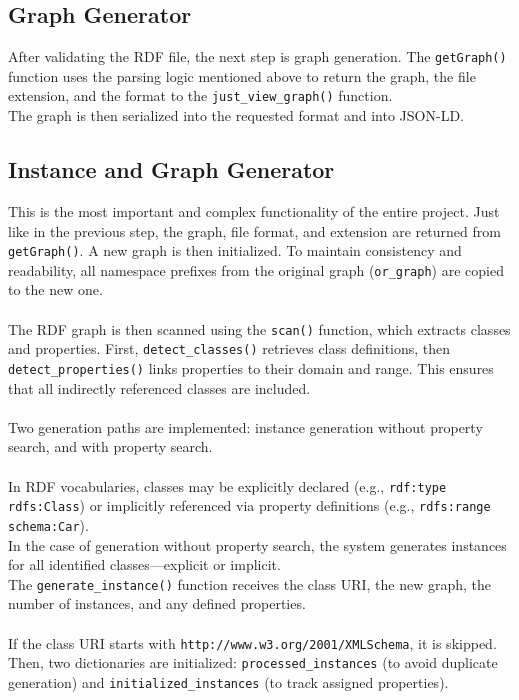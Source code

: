 \subsection{Graph Generator}
After validating the RDF file, the next step is graph generation. The \texttt{getGraph()} function uses the parsing logic mentioned above to return the graph, the file extension, and the format to the \texttt{just\_view\_graph()} function.
\\
The graph is then serialized into the requested format and into JSON-LD.

\subsection{Instance and Graph Generator}
This is the most important and complex functionality of the entire project. 
Just like in the previous step, the graph, file format, and extension are returned from \texttt{getGraph()}.
A new graph is then initialized. To maintain consistency and readability, all namespace prefixes from the original graph (\texttt{or\_graph}) are copied to the new one.
\\
\\
The RDF graph is then scanned using the \texttt{scan()} function, which extracts classes and properties. First, \texttt{detect\_classes()} retrieves class definitions, then \texttt{detect\_properties()} links properties to their domain and range. This ensures that all indirectly referenced classes are included.
\\
\\
Two generation paths are implemented: instance generation without property search, and with property search.
\\
\\
In RDF vocabularies, classes may be explicitly declared (e.g., \texttt{rdf:type rdfs:Class}) or implicitly referenced via property definitions (e.g., \texttt{rdfs:range schema:Car}).
\\
In the case of generation without property search, the system generates instances for all identified classes—explicit or implicit.
\\
The \texttt{generate\_instance()} function receives the class URI, the new graph, the number of instances, and any defined properties.
\\
\\
If the class URI starts with \texttt{http://www.w3.org/2001/XMLSchema}, it is skipped. Then, two dictionaries are initialized: \texttt{processed\_instances} (to avoid duplicate generation) and \texttt{initialized\_instances} (to track assigned properties).
